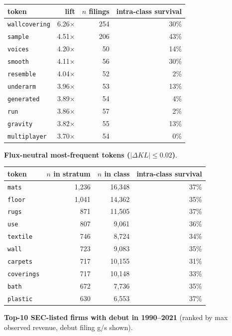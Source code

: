 \begin{tabular}{lrrr}
\toprule
token & lift & $n$ filings & intra-class survival \\
\midrule
\texttt{wallcovering} & 6.26$\times$ & 254 & 30\% \\
\texttt{sample} & 4.51$\times$ & 206 & 43\% \\
\texttt{voices} & 4.20$\times$ & 50 & 14\% \\
\texttt{smooth} & 4.11$\times$ & 56 & 30\% \\
\texttt{resemble} & 4.04$\times$ & 52 & 2\% \\
\texttt{underarm} & 3.96$\times$ & 53 & 13\% \\
\texttt{generated} & 3.89$\times$ & 54 & 4\% \\
\texttt{run} & 3.86$\times$ & 57 & 2\% \\
\texttt{gravity} & 3.82$\times$ & 55 & 13\% \\
\texttt{multiplayer} & 3.70$\times$ & 54 & 0\% \\
\bottomrule
\end{tabular}

\textbf{Flux-neutral most-frequent tokens ($|\Delta KL|\leq 0.02$)}.

\begin{tabular}{lrrr}
\toprule
token & $n$ in stratum & $n$ in class & intra-class survival \\
\midrule
\texttt{mats} & 1,236 & 16,348 & 37\% \\
\texttt{floor} & 1,041 & 14,362 & 35\% \\
\texttt{rugs} & 871 & 11,505 & 37\% \\
\texttt{use} & 807 & 9,061 & 36\% \\
\texttt{textile} & 746 & 8,724 & 34\% \\
\texttt{wall} & 723 & 9,083 & 35\% \\
\texttt{carpets} & 717 & 10,155 & 31\% \\
\texttt{coverings} & 717 & 10,148 & 33\% \\
\texttt{bath} & 672 & 7,736 & 35\% \\
\texttt{plastic} & 630 & 6,553 & 37\% \\
\bottomrule
\end{tabular}

\textbf{Top-10 SEC-listed firms with debut in 1990--2021} (ranked by max observed revenue, debut filing g/s shown).

